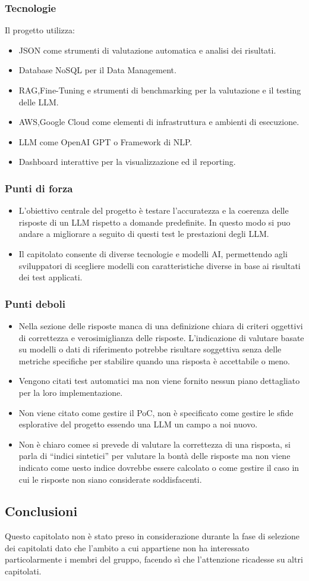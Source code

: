     \subsubsection{Tecnologie}
    Il progetto utilizza:

\begin{itemize}
    \item JSON come strumenti di valutazione automatica e analisi dei risultati.
    \item Database NoSQL per il Data Management.
    \item RAG,Fine-Tuning e strumenti di benchmarking per la valutazione e il testing delle LLM.
    \item AWS,Google Cloud come elementi di infrastruttura e ambienti di esecuzione.
    \item LLM come OpenAI GPT o Framework di NLP.
    \item Dashboard interattive per la visualizzazione ed il reporting.
\end{itemize}
    \subsubsection{Punti di forza}
    \begin{itemize}
    \item L’obiettivo centrale del progetto è testare l’accuratezza e la coerenza delle risposte di un LLM rispetto a domande predefinite. In questo modo si puo andare a migliorare a seguito di questi test le prestazioni degli LLM.
    \item Il capitolato consente di diverse tecnologie e modelli AI, permettendo agli sviluppatori di scegliere modelli con caratteristiche diverse in base ai risultati dei test applicati.
\end{itemize}
    \subsubsection{Punti deboli}
    \begin{itemize}
    \item Nella sezione delle risposte manca di una definizione chiara di criteri oggettivi di correttezza e verosimiglianza delle risposte. L’indicazione di valutare basate su modelli o dati di riferimento potrebbe risultare soggettiva senza delle metriche specifiche per stabilire quando una risposta è accettabile o meno.
    \item Vengono citati test automatici ma non viene fornito nessun piano dettagliato per la loro implementazione.
    \item Non viene citato come gestire il PoC, non è specificato come gestire le sfide esplorative del progetto essendo una LLM un campo a noi nuovo.
    \item Non è chiaro comee si prevede di valutare la correttezza di una risposta, si parla di “indici sintetici” per valutare la bontà delle risposte ma non viene indicato come uesto indice dovrebbe essere calcolato o come gestire il caso in cui le risposte non siano considerate soddisfacenti.
\end{itemize}
    \subsection{Conclusioni}
    Questo capitolato non è stato preso in considerazione durante la fase di selezione dei capitolati dato che l’ambito a cui appartiene non ha interessato particolarmente i membri del gruppo, facendo sì che l’attenzione ricadesse su altri capitolati.
